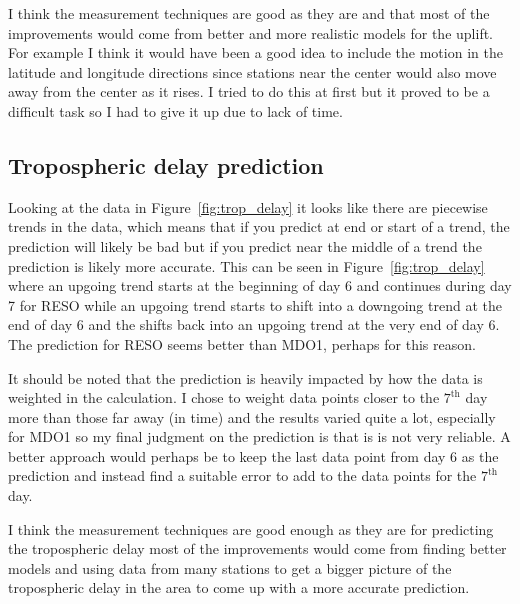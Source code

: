 \documentclass[12pt,a4paper]{article}
\begin{document}
I think the measurement techniques are good as they are and that most of the improvements would come from better and more realistic models for the uplift.
For example I think it would have been a good idea to include the motion in the latitude and longitude directions since stations near the center would also move away from the center as it rises.
I tried to do this at first but it proved to be a difficult task so I had to give it up due to lack of time.

\subsection{Tropospheric delay prediction}
Looking at the data in Figure~\ref{fig:trop_delay} it looks like there are piecewise trends in the data, which means that if you predict at end or start of a trend, the prediction will likely be bad but if you predict near the middle of a trend the prediction is likely more accurate.
This can be seen in Figure~\ref{fig:trop_delay} where an upgoing trend starts at the beginning of day 6 and continues during day 7 for RESO while an upgoing trend starts to shift into a downgoing trend at the end of day 6 and the shifts back into an upgoing trend at the very end of day 6.
The prediction for RESO seems better than MDO1, perhaps for this reason.

It should be noted that the prediction is heavily impacted by how the data is weighted in the calculation.
I chose to weight data points closer to the $7^{\text{th}}$ day more than those far away (in time) and the results varied quite a lot, especially for MDO1 so my final judgment on the prediction is that is is not very reliable.
A better approach would perhaps be to keep the last data point from day 6 as the prediction and instead find a suitable error to add to the data points for the $7^{\text{th}}$ day.

I think the measurement techniques are good enough as they are for predicting the tropospheric delay most of the improvements would come from finding better models and using data from many stations to get a bigger picture of the tropospheric delay in the area to come up with a more accurate prediction.
\end{document}
